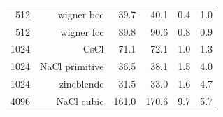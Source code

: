 \begin{tabular}{r | r r r r r}
               512  &          wigner bcc  &          \num{39.7}  &          \num{40.1}  &           \num{0.4}  &           \num{1.0} \\ 
               512  &          wigner fcc  &          \num{89.8}  &          \num{90.6}  &           \num{0.8}  &           \num{0.9} \\ 
              1024  &                CsCl  &          \num{71.1}  &          \num{72.1}  &           \num{1.0}  &           \num{1.3} \\ 
              1024  &      NaCl primitive  &          \num{36.5}  &          \num{38.1}  &           \num{1.5}  &           \num{4.0} \\ 
              1024  &          zincblende  &          \num{31.5}  &          \num{33.0}  &           \num{1.6}  &           \num{4.7} \\ 
              4096  &          NaCl cubic  &         \num{161.0}  &         \num{170.6}  &           \num{9.7}  &           \num{5.7} \\ 
\bottomrule
\end{tabular}
